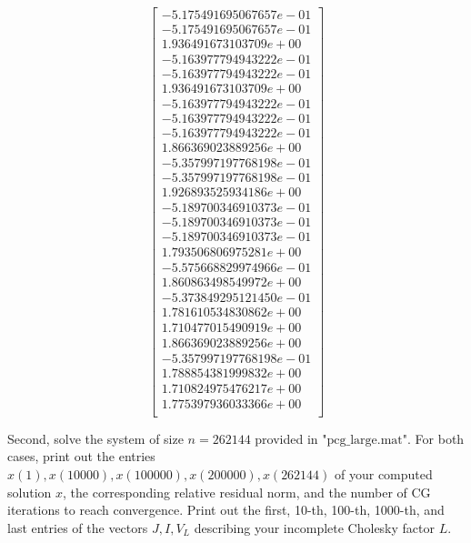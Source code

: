 \documentclass[12pt]{article}
\begin{document}
\begin{itemize}
\begin{small}
$$\begin{bmatrix}
    -5.175491695067657e-01\\
    -5.175491695067657e-01\\
     1.936491673103709e+00\\
    -5.163977794943222e-01\\
    -5.163977794943222e-01\\
     1.936491673103709e+00\\
    -5.163977794943222e-01\\
    -5.163977794943222e-01\\
    -5.163977794943222e-01\\
     1.866369023889256e+00\\
    -5.357997197768198e-01\\
    -5.357997197768198e-01\\
     1.926893525934186e+00\\
    -5.189700346910373e-01\\
    -5.189700346910373e-01\\
    -5.189700346910373e-01\\
     1.793506806975281e+00\\
    -5.575668829974966e-01\\
     1.860863498549972e+00\\
    -5.373849295121450e-01\\
     1.781610534830862e+00\\
     1.710477015490919e+00\\
     1.866369023889256e+00\\
    -5.357997197768198e-01\\
     1.788854381999832e+00\\
     1.710824975476217e+00\\
     1.775397936033366e+00\\
\end{bmatrix}$$

\end{small}

Second, solve the system of size $n=262144$ provided in $\text{"pcg\_large.mat"}$.  For both cases, print out the entries $x(1), x(10000), x(100000), x(200000), x(262144)$ of your computed solution $x$, the corresponding relative residual norm, and the number of CG iterations to reach convergence.  Print out the first, 10-th, 100-th, 1000-th, and last entries of the vectors $J, I, V_L$ describing your incomplete Cholesky factor $L$.\\


\end{itemize}
\end{document}

